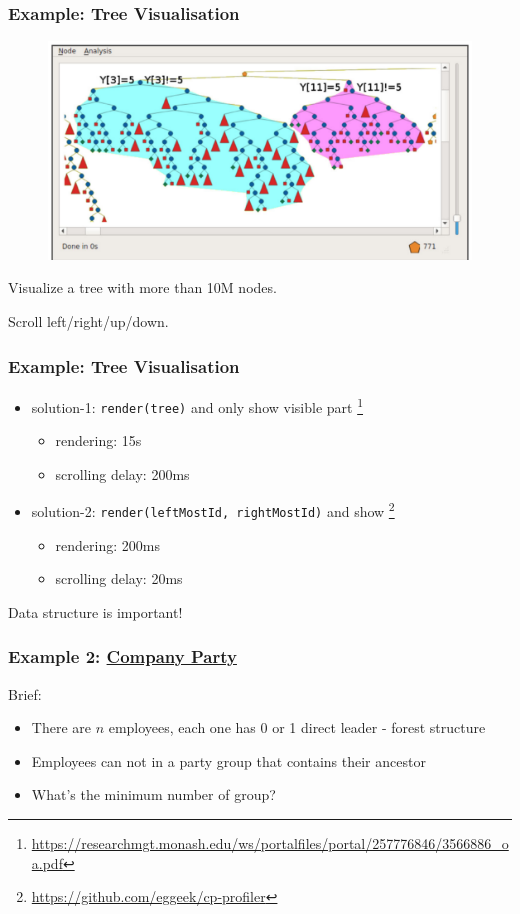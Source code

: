 \documentclass{beamer}
\begin{document}
\begin{frame}
  \frametitle{Example: Tree Visualisation}
\vspace{-5mm}
\begin{figure}[]
  \centering
  \includegraphics[width=.9\textwidth]{figs/visual-tree.png} 
\end{figure}
\small{
Visualize a tree with more than 10M nodes.

Scroll left/right/up/down.
}
\end{frame}

\begin{frame}
  \frametitle{Example: Tree Visualisation}
\begin{itemize}
  \item solution-1: \texttt{\small render(tree)} and only show visible part \footnote{\url{https://researchmgt.monash.edu/ws/portalfiles/portal/257776846/3566886_oa.pdf}}
  \begin{itemize}
    \item rendering: 15s
    \item scrolling delay: 200ms
  \end{itemize}

  \item solution-2: \texttt{\small render(leftMostId, rightMostId)} and show \footnote{\url{https://github.com/eggeek/cp-profiler}}
  \begin{itemize}
    \item rendering: 200ms 
    \item scrolling delay: 20ms
  \end{itemize}
\end{itemize}
\vspace{5mm}
\large {Data structure is important!}
\end{frame}

\begin{frame}
  \frametitle{Example 2: \href{https://vjudge.net/contest/364479\#problem/A}{Company Party}}

Brief:
\begin{itemize}
  \item There are $n$ employees, each one has 0 or 1 direct leader - forest structure
  \item Employees can not in a party group that contains their ancestor
  \item What's the minimum number of group?
\end{itemize}

\end{frame}
\end{document}
